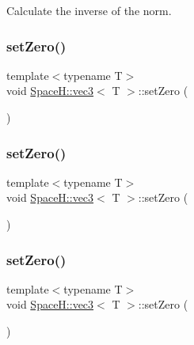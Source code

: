 Calculate the inverse of the norm. 

\mbox{\label{struct_space_h_1_1vec3_ad2e7b91b843f84633372857718f1b5ba}} 
\subsubsection{\texorpdfstring{set\+Zero()}{setZero()}\hspace{0.1cm}{\footnotesize\ttfamily [1/4]}}
{\footnotesize\ttfamily template$<$typename T$>$ \\
void \mbox{\hyperlink{struct_space_h_1_1vec3}{Space\+H\+::vec3}}$<$ T $>$\+::set\+Zero (\begin{DoxyParamCaption}{ }\end{DoxyParamCaption})\hspace{0.3cm}{\ttfamily [inline]}}

\mbox{\label{struct_space_h_1_1vec3_ad2e7b91b843f84633372857718f1b5ba}} 
\subsubsection{\texorpdfstring{set\+Zero()}{setZero()}\hspace{0.1cm}{\footnotesize\ttfamily [2/4]}}
{\footnotesize\ttfamily template$<$typename T$>$ \\
void \mbox{\hyperlink{struct_space_h_1_1vec3}{Space\+H\+::vec3}}$<$ T $>$\+::set\+Zero (\begin{DoxyParamCaption}{ }\end{DoxyParamCaption})\hspace{0.3cm}{\ttfamily [inline]}}

\mbox{\label{struct_space_h_1_1vec3_ad2e7b91b843f84633372857718f1b5ba}} 
\subsubsection{\texorpdfstring{set\+Zero()}{setZero()}\hspace{0.1cm}{\footnotesize\ttfamily [3/4]}}
{\footnotesize\ttfamily template$<$typename T$>$ \\
void \mbox{\hyperlink{struct_space_h_1_1vec3}{Space\+H\+::vec3}}$<$ T $>$\+::set\+Zero (\begin{DoxyParamCaption}{ }\end{DoxyParamCaption})\hspace{0.3cm}{\ttfamily [inline]}}

